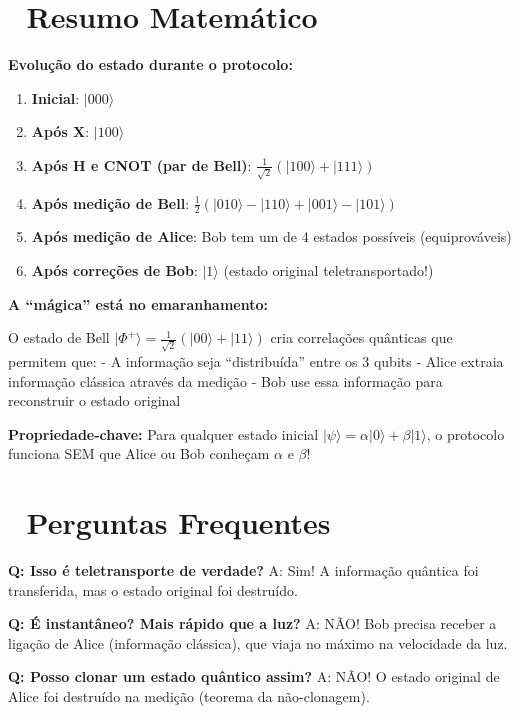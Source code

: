 \documentclass[
  brazilian,
]{report}
\providecommand{\tightlist}{%
  \setlength{\itemsep}{0pt}\setlength{\parskip}{0pt}}
\begin{document}
\section{📐 Resumo Matemático}\label{resumo-matemuxe1tico}

\textbf{Evolução do estado durante o protocolo:}

\begin{enumerate}
\def\labelenumi{\arabic{enumi}.}
\tightlist
\item
  \textbf{Inicial}: \(|000\rangle\)
\item
  \textbf{Após X}: \(|100\rangle\)
\item
  \textbf{Após H e CNOT (par de Bell)}:
  \(\frac{1}{\sqrt{2}}(|100\rangle + |111\rangle)\)
\item
  \textbf{Após medição de Bell}:
  \(\frac{1}{2}(|010\rangle - |110\rangle + |001\rangle - |101\rangle)\)
\item
  \textbf{Após medição de Alice}: Bob tem um de 4 estados possíveis
  (equiprováveis)
\item
  \textbf{Após correções de Bob}: \(|1\rangle\) (estado original
  teletransportado!)
\end{enumerate}

\textbf{A ``mágica'' está no emaranhamento:}

O estado de Bell
\(|\Phi^+\rangle = \frac{1}{\sqrt{2}}(|00\rangle + |11\rangle)\) cria
correlações quânticas que permitem que: - A informação seja
``distribuída'' entre os 3 qubits - Alice extraia informação clássica
através da medição - Bob use essa informação para reconstruir o estado
original

\textbf{Propriedade-chave:} Para qualquer estado inicial
\(|\psi\rangle = \alpha|0\rangle + \beta|1\rangle\), o protocolo
funciona SEM que Alice ou Bob conheçam \(\alpha\) e \(\beta\)!

\section{🤔 Perguntas Frequentes}\label{perguntas-frequentes}

\textbf{Q: Isso é teletransporte de verdade?} A: Sim! A informação
quântica foi transferida, mas o estado original foi destruído.

\textbf{Q: É instantâneo? Mais rápido que a luz?} A: NÃO! Bob precisa
receber a ligação de Alice (informação clássica), que viaja no máximo na
velocidade da luz.

\textbf{Q: Posso clonar um estado quântico assim?} A: NÃO! O estado
original de Alice foi destruído na medição (teorema da não-clonagem).
\end{document}
